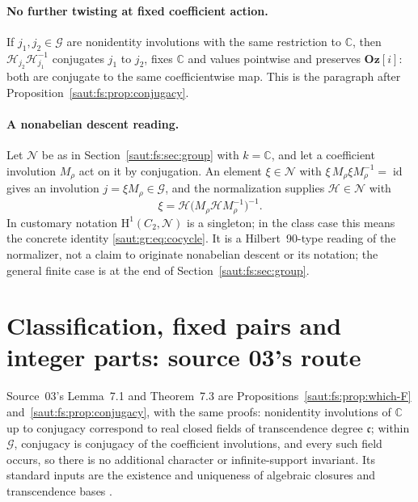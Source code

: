 \documentclass[11pt]{article}
\theoremstyle{definition}
\theoremstyle{remark}
\newcommand{\C}{\mathbb C}
\newcommand{\id}{\operatorname{id}}
\newcommand{\Oz}{\mathbf{Oz}}
\newcommand{\cc}{\mathfrak c}
\numberwithin{equation}{section}
\begin{document}
\paragraph{No further twisting at fixed coefficient action.} If $j_1,j_2\in\mathcal G$ are
nonidentity involutions with the same restriction to $\C$, then
$\mathcal H_{j_2}\mathcal H_{j_1}^{-1}$ conjugates $j_1$ to $j_2$, fixes $\C$ and values
pointwise and preserves $\Oz[i]$: both are conjugate to the same coefficientwise map.
This is the paragraph after Proposition~\ref{saut:fs:prop:conjugacy}.

\paragraph{A nonabelian descent reading.} Let $\mathcal N$ be as in
Section~\ref{saut:fs:sec:group} with $k=\C$, and let a coefficient involution $M_\rho$
act on it by conjugation. An element $\xi\in\mathcal N$ with
$\xi\,M_\rho\xi M_\rho^{-1}=\id$ gives an involution $j=\xi M_\rho\in\mathcal G$, and the
normalization supplies $\mathcal H\in\mathcal N$ with
\begin{equation}\label{saut:gr:eq:cocycle}
 \xi=\mathcal H\bigl(M_\rho\mathcal HM_\rho^{-1}\bigr)^{-1}.
\end{equation}
In customary notation $\mathrm H^1(C_2,\mathcal N)$ is a singleton; in the class case
this means the concrete identity \eqref{saut:gr:eq:cocycle}. It is a Hilbert~90-type
reading of the normalizer, not a claim to originate nonabelian descent or its notation;
the general finite case is at the end of Section~\ref{saut:fs:sec:group}.

\section{Classification, fixed pairs and integer parts: source 03's route}\label{saut:gr:sec:classify}

Source~03's Lemma~7.1 and Theorem~7.3 are Propositions~\ref{saut:fs:prop:which-F}
and~\ref{saut:fs:prop:conjugacy}, with the same proofs: nonidentity involutions of $\C$
up to conjugacy correspond to real closed fields of transcendence degree $\cc$; within
$\mathcal G$, conjugacy is conjugacy of the coefficient involutions, and every such field
occurs, so there is no additional character or infinite-support invariant. Its
standard inputs are the existence and uniqueness of algebraic closures and
transcendence bases \cite{StacksClosure,StacksTranscendence}.
\end{document}
